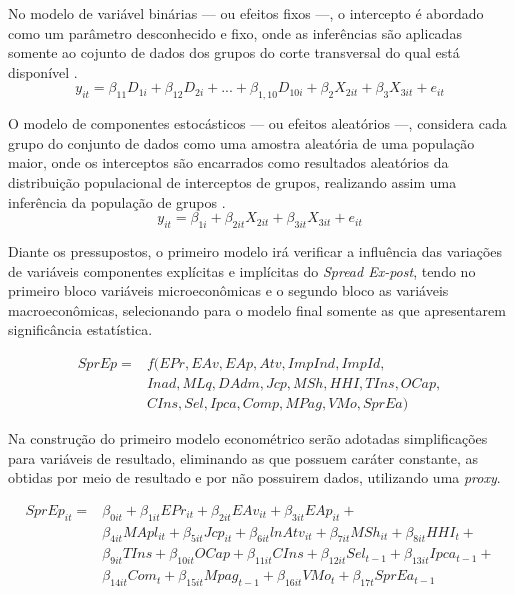 \documentclass[12pt,12pt,openright,oneside,a4paper,chapter=TITLE,section=TITLE,subsection=TITLE,subsubsection=TITLE english,french,spanish,portugues,sumario=tradicional]{abntex2}
\begin{document}
No modelo de variável binárias --- ou efeitos fixos ---, o intercepto é abordado como um parâmetro desconhecido e fixo, onde as inferências são aplicadas somente ao cojunto de dados dos grupos do corte transversal do qual está disponível \cite{hill:2010}.
\[
y_{it} = \beta_{11}D_{1i} + \beta_{12}D_{2i} + ... + \beta_{1,10}D_{10i} + \beta_{2}X_{2it} + \beta_{3}X_{3it} + e_{it}
\]

O modelo de componentes estocásticos --- ou efeitos aleatórios ---, considera cada grupo do conjunto de dados como uma amostra aleatória de uma população maior, onde os interceptos são encarrados como resultados aleatórios da distribuição populacional de interceptos de grupos, realizando assim uma inferência da população de grupos \cite{hill:2010}.
\[
y_{it} = \beta_{1i} + \beta_{2it}X_{2it} + \beta_{3it}X_{3it} + e_{it}
\]

Diante os pressupostos, o primeiro modelo irá verificar a influência das variações de variáveis componentes explícitas e implícitas do \emph{Spread Ex-post}, tendo no primeiro bloco variáveis microeconômicas e o segundo bloco as variáveis macroeconômicas, selecionando para o modelo final somente as que apresentarem significância estatística.

\[\begin{aligned}
SprEp = &f(EPr, EAv, EAp, Atv, ImpInd, ImpId, \\ 
& Inad, MLq, DAdm, Jcp, MSh, HHI, TIns, OCap, \\ 
& CIns, Sel, Ipca, Comp, MPag, VMo, SprEa)
\end{aligned}\]

Na construção do primeiro modelo econométrico serão adotadas simplificações para variáveis de resultado, eliminando as que possuem caráter constante, as obtidas por meio de resultado e por não possuirem dados, utilizando uma \emph{proxy}.

\[\begin{aligned}
SprEp_{it} = & \beta_{0it} + \beta_{1it}EPr_{it} + \beta_{2it}EAv_{it} + \beta_{3it}EAp_{it} + \\
&\beta_{4it}MApl_{it} + \beta_{5it}Jcp_{it}  + \beta_{6it}lnAtv_{it} + \beta_{7it}MSh_{it}  + \beta_{8it}HHI_{t} + \\
& \beta_{9it}TIns + \beta_{10it}OCap + \beta_{11it}CIns + \beta_{12it}Sel_{t-1} + \beta_{13it}Ipca_{t-1} + \\
& \beta_{14it}Com_{t} + \beta_{15it}Mpag_{t-1} + \beta_{16it}VMo_{t} +  \beta_{17t}SprEa_{t-1}
\end{aligned}\]
\end{document}
